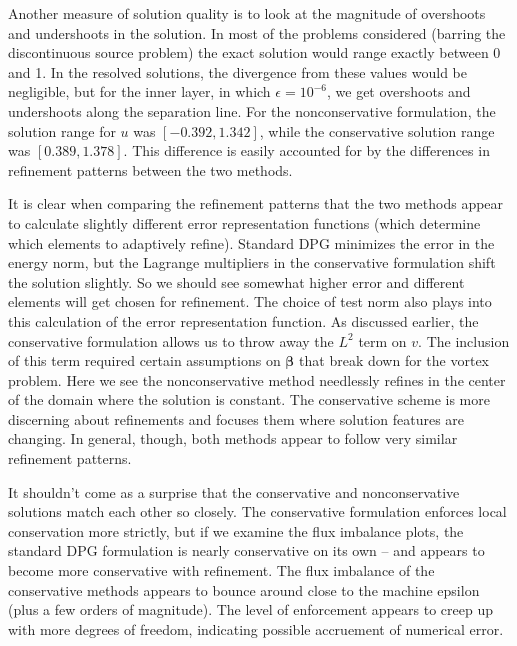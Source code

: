 \documentclass[letterpaper]{article}
\def\bbeta{\boldsymbol\beta}
\begin{document}
Another measure of solution quality is to look at the magnitude of overshoots
and undershoots in the solution. In most of the problems considered (barring
the discontinuous source problem) the exact solution would range exactly
between 0 and 1. In the resolved solutions, the divergence from these values
would be negligible, but for the inner layer, in which $\epsilon=10^{-6}$, we
get overshoots and undershoots along the separation line. For the
nonconservative formulation, the solution range for $u$ was $[-0.392,1.342]$,
while the conservative solution range was $[0.389,1.378]$. This difference is
easily accounted for by the differences in refinement patterns between the two
methods.

It is clear when comparing the refinement patterns that the two methods appear
to calculate slightly different error representation functions (which
determine which elements to adaptively refine). Standard DPG minimizes the
error in the energy norm, but the Lagrange multipliers in the conservative
formulation shift the solution slightly. So we should see somewhat higher
error and different elements will get chosen for refinement. The choice of
test norm also plays into this calculation of the error representation
function. As discussed earlier, the conservative formulation allows us to
throw away the $L^2$ term on $v$. The inclusion of this term required certain
assumptions on $\bbeta$ \cite{ChanHeuerThanhDemkowicz2012} that break down for
the vortex problem. Here we see the nonconservative method needlessly refines
in the center of the domain where the solution is constant. The conservative
scheme is more discerning about refinements and focuses them where
solution features are changing. In general, though, both methods appear to
follow very similar refinement patterns.

It shouldn't come as a surprise that the conservative and nonconservative
solutions match each other so closely. The conservative formulation
enforces local conservation more strictly, but if we examine the flux
imbalance plots, the standard DPG formulation is nearly conservative on its
own -- and appears to become more conservative with refinement. The flux
imbalance of the conservative methods appears to bounce around close to the
machine epsilon (plus a few orders of magnitude). The level of enforcement
appears to creep up with more degrees of freedom, indicating possible
accruement of numerical error.
\end{document}
